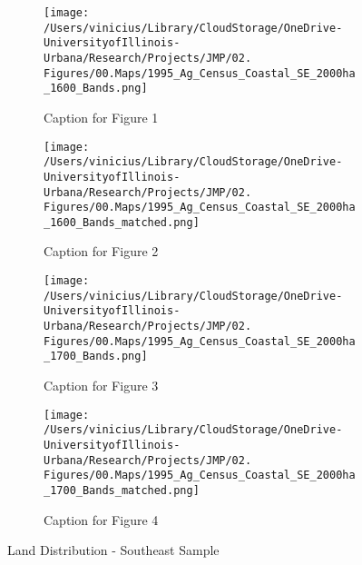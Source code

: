 \documentclass[11pt]{article}
\begin{document}
\begin{landscape}
  \begin{figure}[htbp]
    \centering
    \begin{subfigure}[b]{0.65\textwidth}
        \centering
        \texttt{[image: /Users/vinicius/Library/CloudStorage/OneDrive-UniversityofIllinois-Urbana/Research/Projects/JMP/02. Figures/00.Maps/1995\_Ag\_Census\_Coastal\_SE\_2000ha\_1600\_Bands.png]}
        \caption{Caption for Figure 1}
        \label{fig:fig1}
    \end{subfigure}
    \hfill
    \begin{subfigure}[b]{0.65\textwidth}
        \centering
        \texttt{[image: /Users/vinicius/Library/CloudStorage/OneDrive-UniversityofIllinois-Urbana/Research/Projects/JMP/02. Figures/00.Maps/1995\_Ag\_Census\_Coastal\_SE\_2000ha\_1600\_Bands\_matched.png]}
        \caption{Caption for Figure 2}
        \label{fig:fig2}
    \end{subfigure}

    \vspace{0.1cm} %

    \begin{subfigure}[b]{0.65\textwidth}
        \centering
        \texttt{[image: /Users/vinicius/Library/CloudStorage/OneDrive-UniversityofIllinois-Urbana/Research/Projects/JMP/02. Figures/00.Maps/1995\_Ag\_Census\_Coastal\_SE\_2000ha\_1700\_Bands.png]}
        \caption{Caption for Figure 3}
        \label{fig:fig3}
    \end{subfigure}
    \hfill
    \begin{subfigure}[b]{0.65\textwidth}
        \centering
        \texttt{[image: /Users/vinicius/Library/CloudStorage/OneDrive-UniversityofIllinois-Urbana/Research/Projects/JMP/02. Figures/00.Maps/1995\_Ag\_Census\_Coastal\_SE\_2000ha\_1700\_Bands\_matched.png]}
        \caption{Caption for Figure 4}
        \label{fig:fig4}
    \end{subfigure}

    \vspace{1cm}

    \caption{Land Distribution - Southeast Sample}
    \label{fig:robustness_SE_landsize_distance_cutoff}
    
\end{figure}
\end{landscape}

\clearpage 

\end{document}
